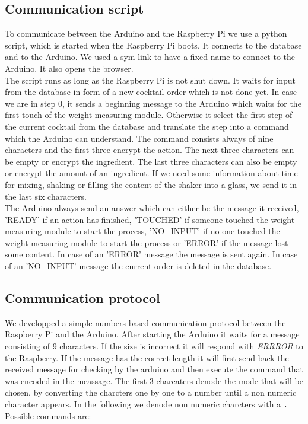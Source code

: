 \documentclass{acm_proc_article-sp}
\begin{document}
\subsection{Communication script}
To communicate between the Arduino and the Raspberry Pi we use a python script, which is started when the Raspberry Pi boots. It connects to the database and to the Arduino. We used a sym link to have a fixed name to connect to the Arduino. It also opens the browser. \\
The script runs as long as the Raspberry Pi is not shut down. It waits for input from the database in form of a new cocktail order which is not done yet. In case we are in step 0, it sends a beginning message to the Arduino which waits for the first touch of the weight measuring module. Otherwise it select the first step of the current cocktail from the database and translate the step into a command which the Arduino can understand. The command consists always of nine characters and the first three encrypt the action. The next three characters can be empty or encrypt the ingredient. The last three characters can also be empty or encrypt the amount of an ingredient. If we need some information about time for mixing, shaking or filling the content of the shaker into a glass, we send it in the last six characters. \\
The Arduino always send an answer which can either be the message it received, 'READY' if an action has finished, 'TOUCHED' if someone touched the weight measuring module to start the process, 'NO\_INPUT' if no one touched the weight measuring module to start the process or 'ERROR' if the message lost some content. In case of an 'ERROR' message the message is sent again. In case of an 'NO\_INPUT' message the current order is deleted in the database.

\subsection{Communication protocol}
We developped a simple numbers based communication protocol between the Raspberry Pi and the Arduino. After starting the Arduino it waits for a message consisting of 9 characters. If the size is incorrect it will respond with \textit{ERRROR} to the Raspberry. If the message has the correct length it will first send back the received message for checking by the arduino and then execute the command that was encoded in the meassage. The first 3 charcaters denode the mode that will be chosen, by converting the charcters one by one to a number until a non numeric character appears. In the following we denode non numeric charcters with a \texttt{.} Possible commands are:
\end{document}
